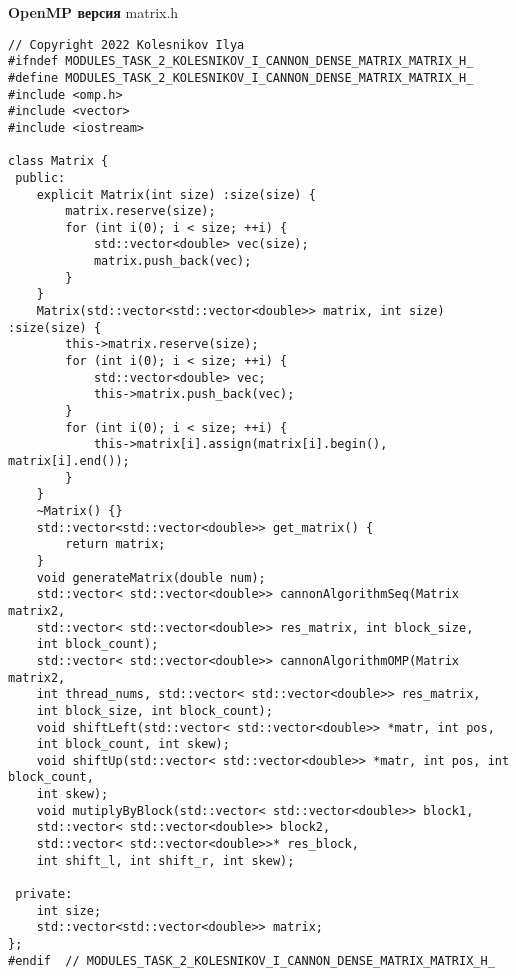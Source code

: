 \documentclass{report}
\begin{document}
\textbf{OpenMP версия}
\newline
\newline matrix.h
\begin{lstlisting}
// Copyright 2022 Kolesnikov Ilya
#ifndef MODULES_TASK_2_KOLESNIKOV_I_CANNON_DENSE_MATRIX_MATRIX_H_
#define MODULES_TASK_2_KOLESNIKOV_I_CANNON_DENSE_MATRIX_MATRIX_H_
#include <omp.h>
#include <vector>
#include <iostream>

class Matrix {
 public:
    explicit Matrix(int size) :size(size) {
        matrix.reserve(size);
        for (int i(0); i < size; ++i) {
            std::vector<double> vec(size);
            matrix.push_back(vec);
        }
    }
    Matrix(std::vector<std::vector<double>> matrix, int size) :size(size) {
        this->matrix.reserve(size);
        for (int i(0); i < size; ++i) {
            std::vector<double> vec;
            this->matrix.push_back(vec);
        }
        for (int i(0); i < size; ++i) {
            this->matrix[i].assign(matrix[i].begin(), matrix[i].end());
        }
    }
    ~Matrix() {}
    std::vector<std::vector<double>> get_matrix() {
        return matrix;
    }
    void generateMatrix(double num);
    std::vector< std::vector<double>> cannonAlgorithmSeq(Matrix matrix2,
    std::vector< std::vector<double>> res_matrix, int block_size,
    int block_count);
    std::vector< std::vector<double>> cannonAlgorithmOMP(Matrix matrix2,
    int thread_nums, std::vector< std::vector<double>> res_matrix,
    int block_size, int block_count);
    void shiftLeft(std::vector< std::vector<double>> *matr, int pos,
    int block_count, int skew);
    void shiftUp(std::vector< std::vector<double>> *matr, int pos, int block_count,
    int skew);
    void mutiplyByBlock(std::vector< std::vector<double>> block1,
    std::vector< std::vector<double>> block2,
    std::vector< std::vector<double>>* res_block,
    int shift_l, int shift_r, int skew);

 private:
    int size;
    std::vector<std::vector<double>> matrix;
};
#endif  // MODULES_TASK_2_KOLESNIKOV_I_CANNON_DENSE_MATRIX_MATRIX_H_
\end{lstlisting}
\end{document}

